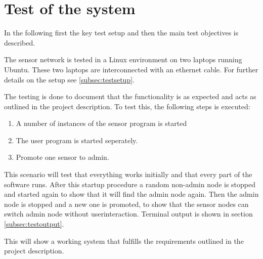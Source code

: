 \section{Test of the system}
\label{sec:testing}
In the following first the key test setup and then the main test objectives is described.

The sensor network is tested in a Linux environment on two laptops running Ubuntu. These two laptops are interconnected with an ethernet cable. For further details on the setup see \ref{subsec:testsetup}.

The testing is done to document that the functionality is as expected and acts as outlined in the project description. To test this, the following steps is executed:
\begin{enumerate}
    \item A number of instances of the sensor program is started
    \item The user program is started seperately.
    \item Promote one sensor to admin.
\end{enumerate}
This scenario will test that everything works initially and that every part of the software runs. 
After this startup procedure a random non-admin node is stopped and started again to show that it will find the admin node again. Then the admin node is stopped and a new one is promoted, to show that the sensor nodes can switch admin node without userinteraction.
Terminal output is shown in section \ref{subsec:testoutput}.

This will show a working system that fulfills the requirements outlined in the project description.

